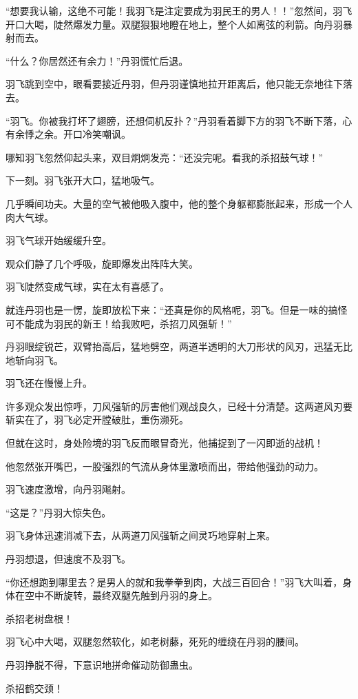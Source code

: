 \begin{this_body}
“想要我认输，这绝不可能！我羽飞是注定要成为羽民王的男人！！”忽然间，羽飞开口大喝，陡然爆发力量。双腿狠狠地瞪在地上，整个人如离弦的利箭。向丹羽暴射而去。

“什么？你居然还有余力！”丹羽慌忙后退。

羽飞跳到空中，眼看要接近丹羽，但丹羽谨慎地拉开距离后，他只能无奈地往下落去。

“羽飞。你被我打坏了翅膀，还想伺机反扑？”丹羽看着脚下方的羽飞不断下落，心有余悸之余。开口冷笑嘲讽。

哪知羽飞忽然仰起头来，双目炯炯发亮：“还没完呢。看我的杀招鼓气球！”

下一刻。羽飞张开大口，猛地吸气。

几乎瞬间功夫。大量的空气被他吸入腹中，他的整个身躯都膨胀起来，形成一个人肉大气球。

羽飞气球开始缓缓升空。

观众们静了几个呼吸，旋即爆发出阵阵大笑。

羽飞陡然变成气球，实在太有喜感了。

就连丹羽也是一愣，旋即放松下来：“还真是你的风格呢，羽飞。但是一味的搞怪可不能成为羽民的新王！给我败吧，杀招刀风强斩！”

丹羽眼绽锐芒，双臂抬高后，猛地劈空，两道半透明的大刀形状的风刃，迅猛无比地斩向羽飞。

羽飞还在慢慢上升。

许多观众发出惊呼，刀风强斩的厉害他们观战良久，已经十分清楚。这两道风刃要斩实在了，羽飞必定开膛破肚，重伤濒死。

但就在这时，身处险境的羽飞反而眼冒奇光，他捕捉到了一闪即逝的战机！

他忽然张开嘴巴，一股强烈的气流从身体里激喷而出，带给他强劲的动力。

羽飞速度激增，向丹羽飚射。

“这是？”丹羽大惊失色。

羽飞身体迅速消减下去，从两道刀风强斩之间灵巧地穿射上来。

丹羽想退，但速度不及羽飞。

“你还想跑到哪里去？是男人的就和我拳拳到肉，大战三百回合！”羽飞大叫着，身体在空中不断旋转，最终双腿先触到丹羽的身上。

杀招老树盘根！

羽飞心中大喝，双腿忽然软化，如老树藤，死死的缠绕在丹羽的腰间。

丹羽挣脱不得，下意识地拼命催动防御蛊虫。

杀招鹤交颈！


\end{this_body}

